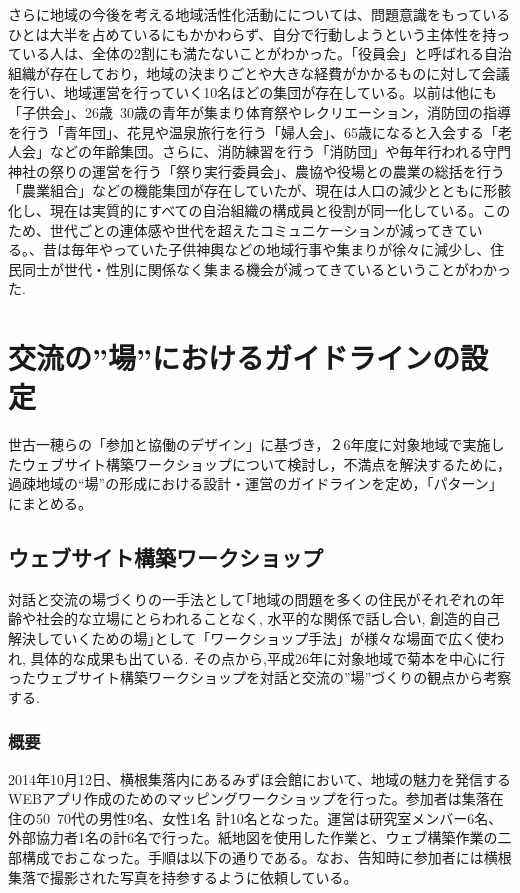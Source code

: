 \documentclass[a4paper]{jsarticle}
\begin{document}
さらに地域の今後を考える地域活性化活動にについては、問題意識をもっているひとは大半を占めているにもかかわらず、自分で行動しようという主体性を持っている人は、全体の2割にも満たないことがわかった。「役員会」と呼ばれる自治組織が存在しており，地域の決まりごとや大きな経費がかかるものに対して会議を行い、地域運営を行っていく10名ほどの集団が存在している。以前は他にも「子供会」、26歳~30歳の青年が集まり体育祭やレクリエーション，消防団の指導を行う「青年団」、花見や温泉旅行を行う「婦人会」、65歳になると入会する「老人会」などの年齢集団。さらに、消防練習を行う「消防団」や毎年行われる守門神社の祭りの運営を行う「祭り実行委員会」、農協や役場との農業の総括を行う「農業組合」などの機能集団が存在していたが、現在は人口の減少とともに形骸化し、現在は実質的にすべての自治組織の構成員と役割が同一化している。このため、世代ごとの連体感や世代を超えたコミュニケーションが減ってきている。、昔は毎年やっていた子供神輿などの地域行事や集まりが徐々に減少し、住民同士が世代・性別に関係なく集まる機会が減ってきているということがわかった.

\newpage
\section{交流の”場”におけるガイドラインの設定}
世古一穂らの「参加と協働のデザイン」\cite{10}に基づき，２6年度に対象地域で実施したウェブサイト構築ワークショップについて検討し，不満点を解決するために，過疎地域の“場”の形成における設計・運営のガイドラインを定め，「パターン」にまとめる。
\subsection{ウェブサイト構築ワークショップ}
対話と交流の場づくりの一手法として｢地域の問題を多くの住民がそれぞれの年齢や社会的な立場にとらわれることなく, 水平的な関係で話し合い, 創造的自己解決していくための場｣\cite{10}として「ワークショップ手法」が様々な場面で広く使われ, 具体的な成果も出ている. その点から,平成26年に対象地域で菊本\cite{10}を中心に行ったウェブサイト構築ワークショップを対話と交流の”場”づくりの観点から考察する.
\subsubsection{概要}
2014年10月12日、横根集落内にあるみずほ会館において、地域の魅力を発信するWEBアプリ作成のためのマッピングワークショップを行った。参加者は集落在住の50~70代の男性9名、女性1名 計10名となった。運営は研究室メンバー6名、外部協力者1名の計6名で行った。紙地図を使用した作業と、ウェブ構築作業の二部構成でおこなった。手順は以下の通りである。なお、告知時に参加者には横根集落で撮影された写真を持参するように依頼している。\\
\end{document}
